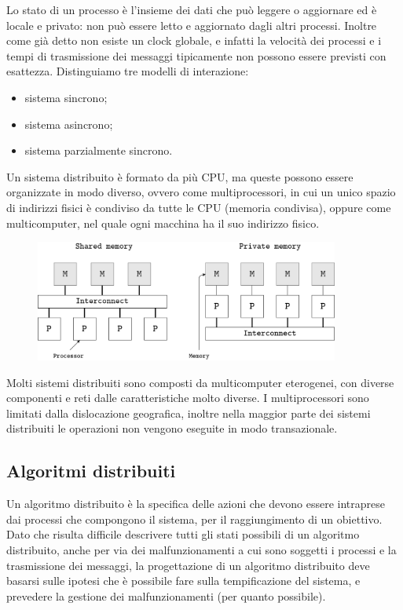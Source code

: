 Lo stato di un processo è l'insieme dei dati che può leggere o aggiornare ed è locale e privato: non può essere letto e aggiornato dagli altri processi. Inoltre come già detto non esiste un clock globale, e infatti la velocità dei processi e i tempi di trasmissione dei messaggi tipicamente non possono essere previsti con esattezza. 
Distinguiamo tre modelli di interazione:
\begin{itemize}
    \item sistema sincrono;
    \item sistema asincrono;
    \item sistema parzialmente sincrono.
\end{itemize}
Un sistema distribuito è formato da più CPU, ma queste possono essere organizzate in modo diverso, ovvero come multiprocessori, in cui un unico spazio di indirizzi fisici è condiviso da tutte le CPU (memoria condivisa), oppure come multicomputer, nel quale ogni macchina ha il suo indirizzo fisico.

\begin{figure}[ht]
    \centering
    \includegraphics[width=10cm]{./Images/cap2/2.1.png}
    \label{fig:image2.1}
\end{figure}

Molti sistemi distribuiti sono composti da multicomputer eterogenei, con diverse componenti e reti dalle caratteristiche molto diverse. I multiprocessori sono limitati dalla dislocazione geografica, inoltre nella maggior parte dei sistemi distribuiti le operazioni non vengono eseguite in modo transazionale.

\subsection{Algoritmi distribuiti}
Un algoritmo distribuito è la specifica delle azioni che devono essere intraprese dai processi che compongono il sistema, per il raggiungimento di un obiettivo.
Dato che risulta difficile descrivere tutti gli stati possibili di un algoritmo distribuito, anche per via dei malfunzionamenti a cui sono soggetti i processi e la trasmissione dei messaggi, la progettazione di un algoritmo distribuito deve basarsi sulle ipotesi che è possibile fare sulla tempificazione del sistema, e prevedere la gestione dei malfunzionamenti (per quanto possibile).

